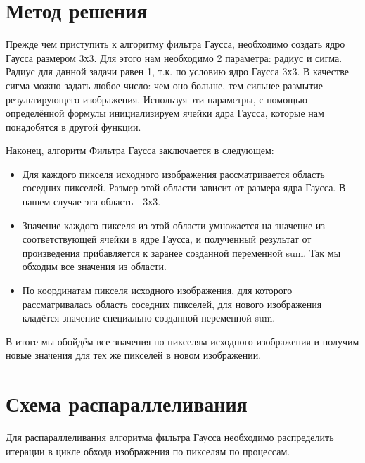 \documentclass{report}
\begin{document}
\section*{Метод решения}
Прежде чем приступить к алгоритму фильтра Гаусса, необходимо создать ядро Гаусса размером 3х3. Для этого нам необходимо 2 параметра: радиус и сигма. Радиус для данной задачи равен 1, т.к. по условию ядро Гаусса 3х3. В качестве сигма можно задать любое число: чем оно больше, тем сильнее размытие результирующего изображения. Используя эти параметры, с помощью определённой формулы инициализируем ячейки ядра Гаусса, которые нам понадобятся в другой функции.
\par Наконец, алгоритм Фильтра Гаусса заключается в следующем:
\begin{itemize}
\item Для каждого пикселя исходного изображения рассматривается область соседних пикселей. Размер этой области зависит от размера ядра Гаусса. В нашем случае эта область - 3х3.
\item Значение каждого пикселя из этой области умножается на значение из соответствующей ячейки в ядре Гаусса, и полученный результат от произведения прибавляется к заранее созданной переменной sum. Так мы обходим все значения из области.
\item По координатам пикселя исходного изображения, для которого рассматривалась область соседних пикселей, для нового изображения кладётся значение специально созданной переменной sum.
\end{itemize}
\par В итоге мы обойдём все значения по пикселям исходного изображения и получим новые значения для тех же пикселей в новом изображении.

\newpage
\section*{Схема распараллеливания}
Для распараллеливания алгоритма фильтра Гаусса необходимо распределить итерации в цикле обхода изображения по пикселям по процессам.

\newpage

\end{document}
